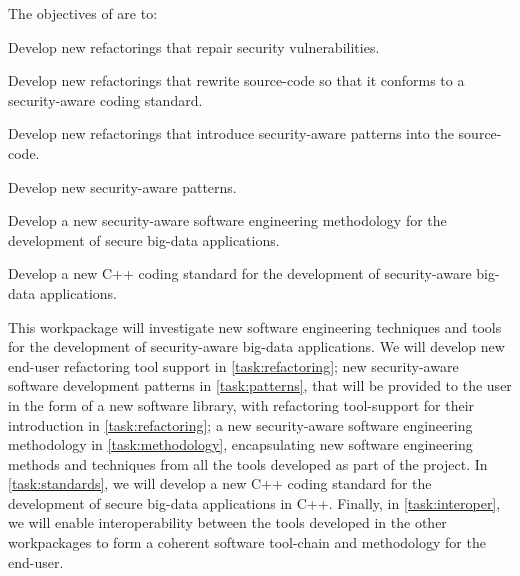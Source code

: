 \addtocounter{wpno}{1}
\begin{Workpackage}{\thewpno}
\WPTitle{\wpname{\thewpno}}


\begin{WPObjectives}
The objectives of \theWP{} are to:
\begin{compactitem}
\item Develop new refactorings that repair security vulnerabilities.
\item Develop new refactorings that rewrite source-code so that it conforms to a security-aware coding standard.
\item Develop new refactorings that introduce security-aware patterns into the source-code.
\item Develop new security-aware patterns.
\item Develop a new security-aware software engineering methodology for the development of secure big-data applications.
\item Develop a new C++ coding standard for the development of security-aware big-data applications.


\end{compactitem}
\end{WPObjectives}

\begin{WPDescription}
This workpackage will investigate new software engineering techniques and tools for the development of security-aware big-data applications. We will develop new end-user refactoring tool support in \ref{task:refactoring}; new security-aware software development patterns in \ref{task:patterns}, that will be provided to the user in the form of a new software library, with refactoring tool-support for their introduction in \ref{task:refactoring}; a new security-aware software engineering methodology in \ref{task:methodology}, encapsulating new software engineering methods and techniques from all the tools developed as part of the \TheProject{} project. In \ref{task:standards}, we will develop a new C++ coding standard for the development of secure big-data applications in C++. Finally, in \ref{task:interoper}, we will enable interoperability between the tools developed in the other workpackages to form a coherent software tool-chain and methodology for the end-user.


\end{WPDescription}

\begin{Task}


\end{Task}
\end{Workpackage}
